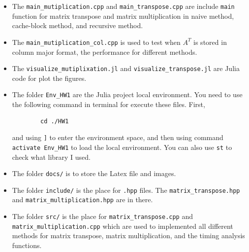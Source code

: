 \documentclass[11pt]{article}
\begin{document}
\begin{itemize}
    \item The \verb|main_mutiplication.cpp| and \verb|main_transpose.cpp| are include \verb|main| function for matrix transpose and matrix multiplication in naive method, cache-block method, and recursive method. 
    \item The \verb|main_mutiplication_col.cpp| is used to test when $A^T$ is stored in column major format, the performance for different methods.
    \item The \verb|visualize_mutiplixation.jl| and \verb|visualize_transpose.jl| are Julia code for plot the figures.
    \item The folder \verb|Env_HW1| are the Julia project local environment. You need to use the following command in terminal for execute these files. First,
    \begin{verbatim}
        cd ./HW1
    \end{verbatim}
    and using \verb|]| to enter the environment space, and then using command \verb|activate Env_HW1| to load the local environment. You can also use \verb|st| to check what library I used.
    \item The folder \texttt{docs/} is to store the Latex file and images.
    \item The folder \texttt{include/} is the place for \verb|.hpp| files. The \verb|matrix_transpose.hpp| and \verb|matrix_multiplication.hpp| are in there.
    \item The folder \texttt{src/} is the place for \verb|matrix_transpose.cpp| and \verb|matrix_multiplication.cpp| which are used to implemented all different methods for matrix transpose, matrix multiplication, and the timing analysis functions.

\end{itemize}

\newpage
\end{document}
